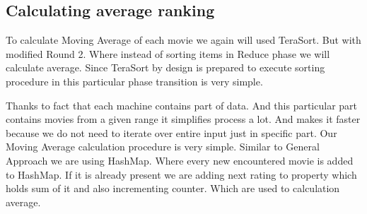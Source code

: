\subsection{Calculating average ranking}
To calculate Moving Average of each movie we again will used TeraSort.
But with modified Round 2. Where instead of sorting items in Reduce phase
we will calculate average. Since TeraSort by design is prepared to execute
sorting procedure in this particular phase transition is very simple.

Thanks to fact that each machine contains part of data. And this particular part contains movies from
a given range it simplifies process a lot. And makes it faster because we do not need to iterate over entire
input just in specific part.
Our Moving Average calculation procedure is very simple. Similar to General Approach
we are using HashMap. Where every new encountered movie is added to HashMap. If it is already
present we are adding next rating to property which holds sum of it and also incrementing counter.
Which are used to calculation average.







